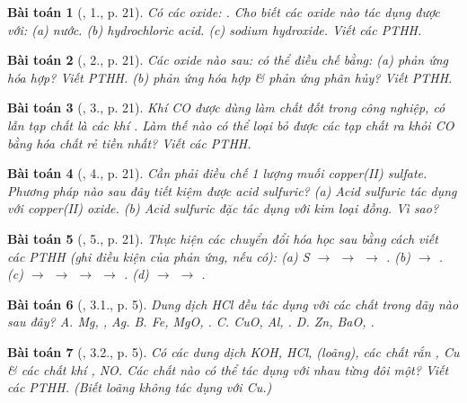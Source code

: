 \documentclass{article}
\newtheorem{baitoan}{Bài toán}
\begin{document}
\begin{baitoan}[\cite{SGK_Hoa_Hoc_9}, 1., p. 21]
	Có các oxide: \emph{}. Cho biết các oxide nào tác dụng được với: (a) nước. (b) hydrochloric acid. (c) sodium hydroxide. Viết các PTHH.
\end{baitoan}

\begin{baitoan}[\cite{SGK_Hoa_Hoc_9}, 2., p. 21]
	Các oxide nào sau: \emph{} có thể điều chế bằng: (a) phản ứng hóa hợp? Viết PTHH. (b) phản ứng hóa hợp \& phản ứng phân hủy? Viết PTHH.
\end{baitoan}

\begin{baitoan}[\cite{SGK_Hoa_Hoc_9}, 3., p. 21]
	Khí \emph{CO} được dùng làm chất đốt trong công nghiệp, có lẫn tạp chất là các khí \emph{}. Làm thế nào có thể loại bỏ được các tạp chất ra khỏi \emph{CO} bằng hóa chất rẻ tiền nhất? Viết các PTHH.
\end{baitoan}

\begin{baitoan}[\cite{SGK_Hoa_Hoc_9}, 4., p. 21]
	Cần phải điều chế 1 lượng muối copper(II) sulfate. Phương pháp nào sau đây tiết kiệm được acid sulfuric? (a) Acid sulfuric tác dụng với copper(II) oxide. (b) Acid sulfuric đặc tác dụng với kim loại đồng. Vì sao?
\end{baitoan}

\begin{baitoan}[\cite{SGK_Hoa_Hoc_9}, 5., p. 21]
	Thực hiện các chuyển đổi hóa học sau bằng cách viết các PTHH (ghi điều kiện của phản ứng, nếu có): (a) \emph{S $\to$  $\to$  $\to$ }. (b) \emph{ $\to$ }. (c) \emph{ $\to$  $\to$  $\to$  $\to$ }. (d) \emph{ $\to$  $\to$ }.
\end{baitoan}

\begin{baitoan}[\cite{SBT_Hoa_Hoc_9}, 3.1., p. 5]
	Dung dịch \emph{HCl} đều tác dụng với các chất trong dãy nào sau đây? {\sf A.} \emph{Mg, , Ag}. {\sf B.} \emph{Fe, MgO, }. {\sf C.} \emph{CuO, Al, }. {\sf D.} \emph{Zn, BaO, }.
\end{baitoan}

\begin{baitoan}[\cite{SBT_Hoa_Hoc_9}, 3.2., p. 5]
	Có các dung dịch \emph{KOH, HCl, } (loãng), các chất rắn \emph{, Cu} \& các chất khí \emph{, NO}. Các chất nào có thể tác dụng với nhau từng đôi một? Viết các PTHH. (Biết \emph{} loãng không tác dụng với \emph{Cu}.)
\end{baitoan}
\end{document}
